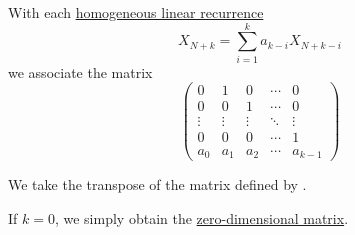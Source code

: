 \begin{definition}\label{def:homogeneous_linear_recurrence_matrix}\mimprovised
  With each \hyperref[def:homogeneous_linear_recurrence]{homogeneous linear recurrence}
  \begin{equation*}
    X_{N+k} = \sum_{i=1}^k a_{k-i} X_{N+k-i}
  \end{equation*}
  we associate the matrix
  \begin{equation}\label{eq:def:homogeneous_linear_recurrence}
    \begin{pmatrix}
      0      & 1      & 0      & \cdots & 0      \\
      0      & 0      & 1      & \cdots & 0      \\
      \vdots & \vdots & \vdots & \ddots & \vdots \\
      0      & 0      & 0      & \cdots & 1      \\
      a_0    & a_1    & a_2    & \cdots & a_{k-1}
    \end{pmatrix}
  \end{equation}
\end{definition}
\begin{comments}
  \item We take the transpose of the matrix defined by .
  \item If \( k = 0 \), we simply obtain the \hyperref[ex:def:array/zero_dimensional]{zero-dimensional matrix}.
\end{comments}

